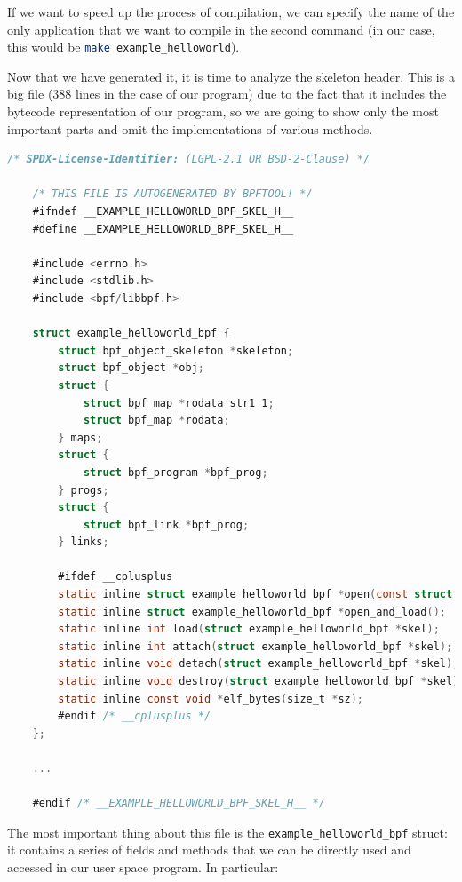 If we want to speed up the process of compilation, we can specify the name of the only application that we want to compile in the second command (in our case, this would be \colorbox{backcolour}{\lstinline[style=commandline, language=bash, breaklines=true]|make example_helloworld|}).

Now that we have generated it, it is time to analyze the skeleton header.
This is a big file (388 lines in the case of our program) due to the fact that it includes the bytecode representation of our program, so we are going to show only the most important parts and omit the implementations of various methods.

\begin{lstlisting}[style=cstyle, language=C, caption={Code of the skeleton file generated from the ``Hello world!''-like program in libbpf-bootstrap.}, title=example\_helloworld.skel.h]
	/* SPDX-License-Identifier: (LGPL-2.1 OR BSD-2-Clause) */
	
	/* THIS FILE IS AUTOGENERATED BY BPFTOOL! */
	#ifndef __EXAMPLE_HELLOWORLD_BPF_SKEL_H__
	#define __EXAMPLE_HELLOWORLD_BPF_SKEL_H__
	
	#include <errno.h>
	#include <stdlib.h>
	#include <bpf/libbpf.h>
	
	struct example_helloworld_bpf {
		struct bpf_object_skeleton *skeleton;
		struct bpf_object *obj;
		struct {
			struct bpf_map *rodata_str1_1;
			struct bpf_map *rodata;
		} maps;
		struct {
			struct bpf_program *bpf_prog;
		} progs;
		struct {
			struct bpf_link *bpf_prog;
		} links;
		
		#ifdef __cplusplus
		static inline struct example_helloworld_bpf *open(const struct bpf_object_open_opts *opts = nullptr);
		static inline struct example_helloworld_bpf *open_and_load();
		static inline int load(struct example_helloworld_bpf *skel);
		static inline int attach(struct example_helloworld_bpf *skel);
		static inline void detach(struct example_helloworld_bpf *skel);
		static inline void destroy(struct example_helloworld_bpf *skel);
		static inline const void *elf_bytes(size_t *sz);
		#endif /* __cplusplus */
	};
	
	...
	
	#endif /* __EXAMPLE_HELLOWORLD_BPF_SKEL_H__ */
\end{lstlisting}

The most important thing about this file is the \colorbox{backcolour}{\lstinline[style=commandline, language=bash, breaklines=true]|example_helloworld_bpf|} struct: it contains a series of fields and methods that we can be directly used and accessed in our user space program.
In particular:

